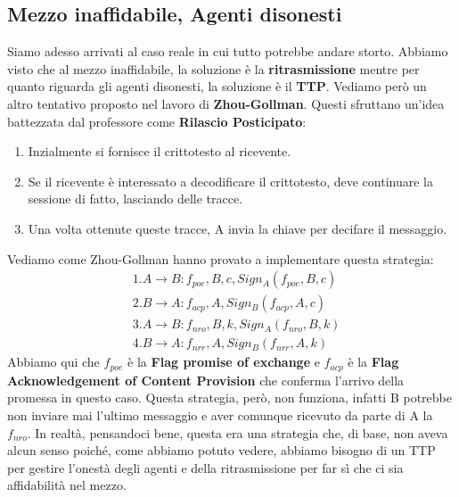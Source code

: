 \subsection{Mezzo inaffidabile, Agenti disonesti}
Siamo adesso arrivati al caso reale in cui tutto potrebbe andare storto. Abbiamo visto che al mezzo inaffidabile, la soluzione è la \textbf{ritrasmissione} mentre per quanto riguarda gli agenti disonesti, la soluzione è il \textbf{TTP}. Vediamo però un altro tentativo proposto nel lavoro di \textbf{Zhou-Gollman}. Questi sfruttano un'idea battezzata dal professore come \textbf{Rilascio Posticipato}:
\begin{enumerate}
    \item Inzialmente si fornisce il crittotesto al ricevente.
    \item Se il ricevente è interessato a decodificare il crittotesto, deve continuare la sessione di fatto, lasciando delle tracce.
    \item Una volta ottenute queste tracce, A invia la chiave per decifare il messaggio.
\end{enumerate}
Vediamo come Zhou-Gollman hanno provato a implementare questa strategia:
\begin{align*}
    &1. A \to B: f_{poe}, B,c,Sign_A(f_{poe},B,c)\\
    &2. B \to A: f_{acp}, A, Sign_B(f_{acp},A,c)\\
    &3. A \to B: f_{nro}, B, k, Sign_A(f_{nro},B,k)\\
    &4. B \to A: f_{nrr}, A, Sign_B(f_{nrr}, A,k)
\end{align*}
Abbiamo qui che $f_{poe}$ è la \textbf{Flag promise of exchange} e $f_{acp}$ è la \textbf{Flag Acknowledgement of Content Provision} che conferma l'arrivo della promessa in questo caso. Questa strategia, però, non funziona, infatti B potrebbe non inviare mai l'ultimo messaggio e aver comunque ricevuto da parte di A la $f_{nro}$. 
In realtà, pensandoci bene, questa era una strategia che, di base, non aveva alcun senso poiché, come abbiamo potuto vedere, abbiamo bisogno di un TTP per gestire l'onestà degli agenti e della ritrasmissione per far sì che ci sia affidabilità nel mezzo.
